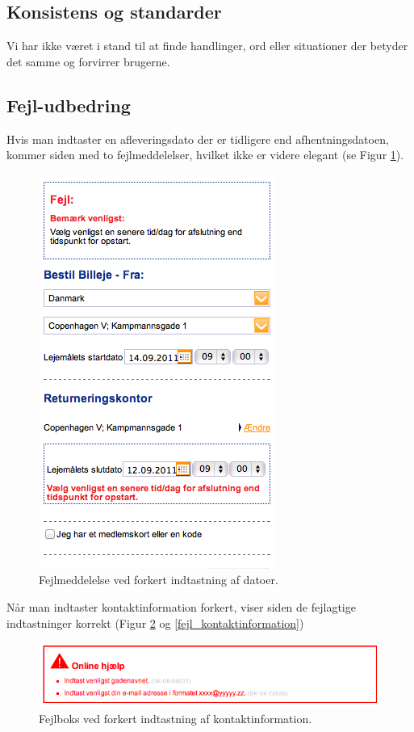 \documentclass[a4paper]{article}
\begin{document}
\subsection{Konsistens og standarder}
Vi har ikke været i stand til at finde handlinger, ord eller situationer der
betyder det samme og forvirrer brugerne.

\subsection{Fejl-udbedring}
Hvis man indtaster en afleveringsdato der er tidligere end afhentningsdatoen,
kommer siden med to fejlmeddelelser, hvilket ikke er videre elegant (se Figur
\ref{fejl_datoer}).

\begin{figure}[htbp]
  \begin{center}
    \includegraphics[scale=.6]{6.png}
  \end{center}
  \caption{Fejlmeddelelse ved forkert indtastning af datoer.}
  \label{fejl_datoer}
\end{figure}

Når man indtaster kontaktinformation forkert, viser siden de fejlagtige
indtastninger korrekt (Figur \ref{fejl_boks} og \ref{fejl_kontaktinformation})

\begin{figure}[htbp]
  \begin{center}
    \includegraphics[scale=.6]{10.png}
  \end{center}
  \caption{Fejlboks ved forkert indtastning af kontaktinformation.}
  \label{fejl_boks}
\end{figure}
\end{document}

